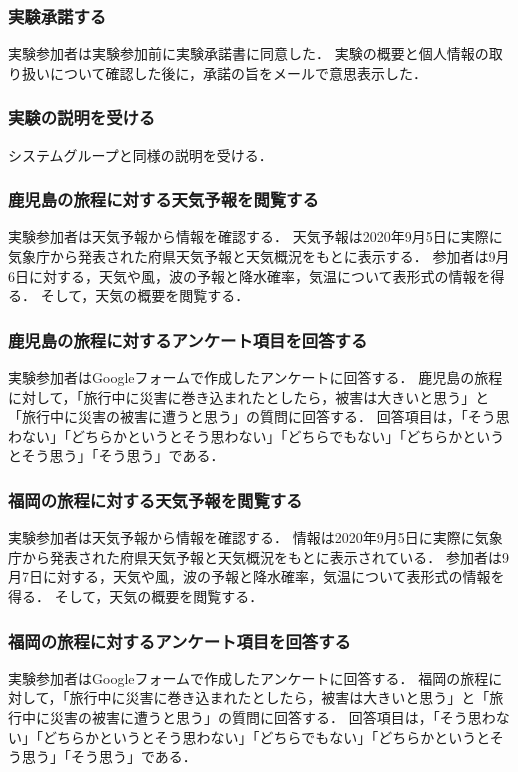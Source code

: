 \subsubsection {実験承諾する}
実験参加者は実験参加前に実験承諾書に同意した．
実験の概要と個人情報の取り扱いについて確認した後に，承諾の旨をメールで意思表示した．

\subsubsection {実験の説明を受ける}
システムグループと同様の説明を受ける．

\subsubsection {鹿児島の旅程に対する天気予報を閲覧する}
実験参加者は天気予報から情報を確認する．
天気予報は2020年9月5日に実際に気象庁から発表された府県天気予報と天気概況をもとに表示する．
参加者は9月6日に対する，天気や風，波の予報と降水確率，気温について表形式の情報を得る．
そして，天気の概要を閲覧する．

\subsubsection {鹿児島の旅程に対するアンケート項目を回答する}
実験参加者はGoogleフォームで作成したアンケートに回答する．
鹿児島の旅程に対して，「旅行中に災害に巻き込まれたとしたら，被害は大きいと思う」と「旅行中に災害の被害に遭うと思う」の質問に回答する．
回答項目は，「そう思わない」「どちらかというとそう思わない」「どちらでもない」「どちらかというとそう思う」「そう思う」である．

\subsubsection {福岡の旅程に対する天気予報を閲覧する}
実験参加者は天気予報から情報を確認する．
情報は2020年9月5日に実際に気象庁から発表された府県天気予報と天気概況をもとに表示されている．
参加者は9月7日に対する，天気や風，波の予報と降水確率，気温について表形式の情報を得る．
そして，天気の概要を閲覧する．

\subsubsection {福岡の旅程に対するアンケート項目を回答する}
実験参加者はGoogleフォームで作成したアンケートに回答する．
福岡の旅程に対して，「旅行中に災害に巻き込まれたとしたら，被害は大きいと思う」と「旅行中に災害の被害に遭うと思う」の質問に回答する．
回答項目は，「そう思わない」「どちらかというとそう思わない」「どちらでもない」「どちらかというとそう思う」「そう思う」である．